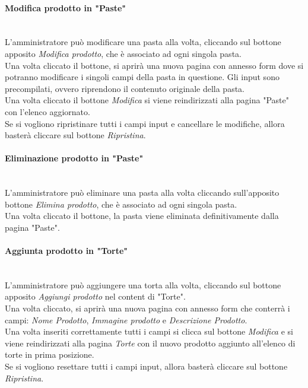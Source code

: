 \paragraph{Modifica prodotto in "Paste"}\mbox{}\\
\label{par:ModP}
L'amministratore può modificare una pasta alla volta, cliccando sul bottone apposito \emph{Modifica prodotto}, che è associato ad ogni singola pasta.\\ 
Una volta cliccato il bottone, si aprirà una nuova pagina con annesso form dove si potranno modificare i singoli campi della pasta in questione. 
Gli input sono precompilati, ovvero riprendono il contenuto originale della pasta.\\
Una volta cliccato il bottone \emph{Modifica} si viene reindirizzati alla pagina "Paste" con l'elenco aggiornato.\\
Se si vogliono ripristinare tutti i campi input e cancellare le modifiche, allora basterà cliccare sul bottone \emph{Ripristina}.

\paragraph{Eliminazione prodotto in "Paste"}\mbox{}\\
\label{par:DelP}
L'amministratore può eliminare una pasta alla volta cliccando sull'apposito bottone \emph{Elimina prodotto}, che è associato ad ogni singola pasta.\\ 
Una volta cliccato il bottone, la pasta viene eliminata definitivamente dalla pagina "Paste".\\

\paragraph{Aggiunta prodotto in "Torte"}\mbox{}\\
\label{par:AddT}
L'amministratore può aggiungere una torta alla volta, cliccando sul bottone apposito \emph{Aggiungi prodotto} nel content di "Torte".\\
Una volta cliccato, si aprirà una nuova pagina con annesso form che conterrà i campi: \emph{Nome Prodotto}, \emph{Immagine prodotto} e \emph{Descrizione Prodotto}.\\ 
Una volta inseriti correttamente tutti i campi si clicca sul bottone \emph{Modifica} e si viene reindirizzati alla pagina \emph{Torte} con il nuovo prodotto 
aggiunto all'elenco di torte in prima posizione.\\
Se si vogliono resettare tutti i campi input, allora basterà cliccare sul bottone \emph{Ripristina}.

